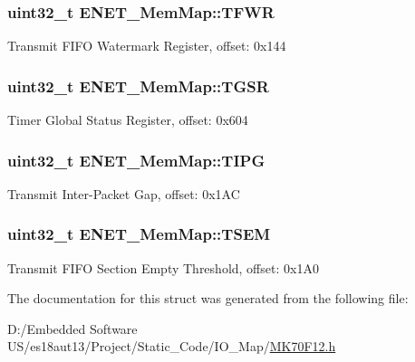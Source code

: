 \subsubsection[{T\+F\+W\+R}]{\setlength{\rightskip}{0pt plus 5cm}uint32\+\_\+t E\+N\+E\+T\+\_\+\+Mem\+Map\+::\+T\+F\+W\+R}\label{struct_e_n_e_t___mem_map_aef8b194a94a2a24c0f705e65af5bee24}
Transmit F\+I\+F\+O Watermark Register, offset\+: 0x144 \hypertarget{struct_e_n_e_t___mem_map_af759f85ad62d7a7d8937391b0eb9f4d4}{}
\subsubsection[{T\+G\+S\+R}]{\setlength{\rightskip}{0pt plus 5cm}uint32\+\_\+t E\+N\+E\+T\+\_\+\+Mem\+Map\+::\+T\+G\+S\+R}\label{struct_e_n_e_t___mem_map_af759f85ad62d7a7d8937391b0eb9f4d4}
Timer Global Status Register, offset\+: 0x604 \hypertarget{struct_e_n_e_t___mem_map_a33c2b64aa493e8e381cd207ac9c6e8ec}{}
\subsubsection[{T\+I\+P\+G}]{\setlength{\rightskip}{0pt plus 5cm}uint32\+\_\+t E\+N\+E\+T\+\_\+\+Mem\+Map\+::\+T\+I\+P\+G}\label{struct_e_n_e_t___mem_map_a33c2b64aa493e8e381cd207ac9c6e8ec}
Transmit Inter-\/\+Packet Gap, offset\+: 0x1\+A\+C \hypertarget{struct_e_n_e_t___mem_map_a8cb50de4da08a100de4f82ddc5f4eb9e}{}
\subsubsection[{T\+S\+E\+M}]{\setlength{\rightskip}{0pt plus 5cm}uint32\+\_\+t E\+N\+E\+T\+\_\+\+Mem\+Map\+::\+T\+S\+E\+M}\label{struct_e_n_e_t___mem_map_a8cb50de4da08a100de4f82ddc5f4eb9e}
Transmit F\+I\+F\+O Section Empty Threshold, offset\+: 0x1\+A0 

The documentation for this struct was generated from the following file\+:\begin{DoxyCompactItemize}
\item 
D\+:/\+Embedded Software U\+S/es18aut13/\+Project/\+Static\+\_\+\+Code/\+I\+O\+\_\+\+Map/\hyperlink{_m_k70_f12_8h}{M\+K70\+F12.\+h}\end{DoxyCompactItemize}
